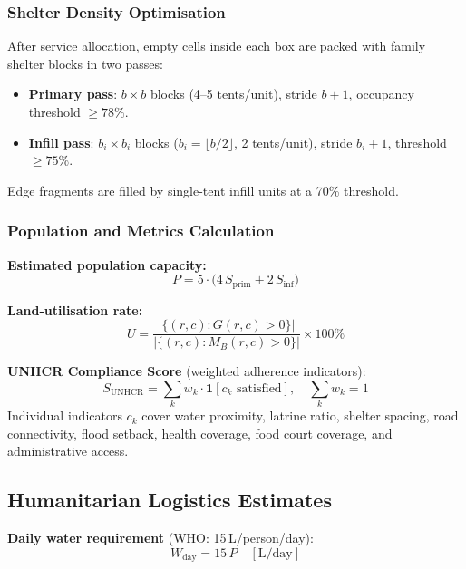 \documentclass[twocolumn]{article}
\begin{document}
\subsubsection{Shelter Density Optimisation}

After service allocation, empty cells inside each box are packed with family shelter blocks in two
passes:
\begin{itemize}[leftmargin=*,nosep,topsep=2pt]
  \item \textbf{Primary pass}: $b{\times}b$ blocks (4--5 tents/unit), stride $b+1$, occupancy
        threshold $\ge 78\%$.
  \item \textbf{Infill pass}: $b_i{\times}b_i$ blocks ($b_i=\lfloor b/2\rfloor$, 2 tents/unit),
        stride $b_i+1$, threshold $\ge 75\%$.
\end{itemize}
Edge fragments are filled by single-tent infill units at a 70\% threshold.

\subsubsection{Population and Metrics Calculation}

\noindent\textbf{Estimated population capacity:}
\begin{equation}
  P = 5\cdot\bigl(4\,S_\mathrm{prim} + 2\,S_\mathrm{inf}\bigr)
  \label{eq:pop}
\end{equation}

\noindent\textbf{Land-utilisation rate:}
\begin{equation}
  U = \frac{\bigl|\{(r,c):G(r,c)>0\}\bigr|}
           {\bigl|\{(r,c):M_B(r,c)>0\}\bigr|}
      \times 100\%
  \label{eq:util}
\end{equation}

\noindent\textbf{UNHCR Compliance Score} (weighted adherence indicators):
\begin{equation}
  S_\mathrm{UNHCR} = \sum_{k} w_k \cdot \mathbf{1}[c_k \text{ satisfied}], \quad
  \sum_k w_k = 1
  \label{eq:score}
\end{equation}
Individual indicators $c_k$ cover water proximity, latrine ratio, shelter spacing, road
connectivity, flood setback, health coverage, food court coverage, and administrative access.

\subsection{Humanitarian Logistics Estimates}

\noindent\textbf{Daily water requirement} (WHO: 15\,L/person/day):
\begin{equation}
  W_\mathrm{day} = 15\,P \quad [\mathrm{L/day}]
  \label{eq:water}
\end{equation}
\end{document}
